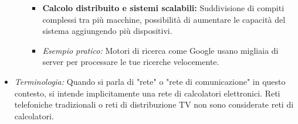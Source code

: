 \begin{itemize}
\begin{enumerate}
\begin{itemize}
            \item \textbf{Calcolo distribuito e sistemi scalabili:} Suddivisione di compiti complessi tra più macchine, possibilità di aumentare le capacità del sistema aggiungendo più dispositivi.
            \item \textit{Esempio pratico:} Motori di ricerca come Google usano migliaia di server per processare le tue ricerche velocemente.
        \end{itemize}
    \end{enumerate}
    \item \textit{Terminologia:} Quando si parla di "rete" o "rete di comunicazione" in questo contesto, si intende implicitamente una rete di calcolatori elettronici. Reti telefoniche tradizionali o reti di distribuzione TV non sono considerate reti di calcolatori.
\end{itemize}

